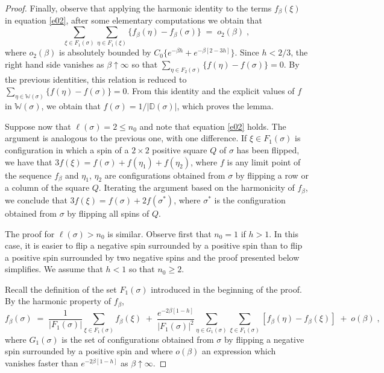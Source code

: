 \documentclass[reqno]{amsart}
\begin{document}
\begin{proof}
Finally, observe that applying the harmonic identity to the terms
$f_\beta(\xi)$ in equation \eqref{e02}, after some elementary
computations we obtain that
\begin{equation*}
\sum_{\xi\in F_1(\sigma)} \sum_{\eta\in F_1(\xi)} 
\{ f_\beta(\eta) - f_\beta(\sigma) \} \;=\;  o_2(\beta) \;,
\end{equation*}
where $o_2(\beta)$ is absolutely bounded by $C_0 \{e^{-\beta h} +
e^{-\beta [2-3h]}\}$. Since $h<2/3$, the right hand side vanishes as
$\beta\uparrow\infty$ so that $\sum_{\eta\in F_2(\sigma)} \{ f(\eta) -
f(\sigma) \} = 0$. By the previous identities, this relation is
reduced to $\sum_{\eta\in {{\mathbb W}}(\sigma)} \{ f(\eta) - f(\sigma) \} =
0$. From this identity and the explicit values of $f$ in ${{\mathbb W}}(\sigma)$, we obtain that $f(\sigma) = 1/|{{\mathbb D}}(\sigma)|$, which
proves the lemma.

Suppose now that $\ell(\sigma)=2\le n_0$ and note that equation
\eqref{e02} holds. The argument is analogous to the previous one, with
one difference. If $\xi\in F_1(\sigma)$ is configuration in which a
spin of a $2\times 2$ positive square $Q$ of $\sigma$ has been
flipped, we have that $3 f(\xi) = f(\sigma) + f(\eta_1) + f(\eta_2)$,
where $f$ is any limit point of the sequence $f_\beta$ and $\eta_1$,
$\eta_2$ are configurations obtained from $\sigma$ by flipping a row
or a column of the square $Q$. Iterating the argument based on the
harmonicity of $f_\beta$, we conclude that $3 f(\xi) = f(\sigma) + 2
f(\sigma^*)$, where $\sigma^*$ is the configuration obtained from
$\sigma$ by flipping all spins of $Q$.

The proof for $\ell (\sigma)>n_0$ is similar. Observe first that
$n_0=1$ if $h>1$. In this case, it is easier to flip a negative spin
surrounded by a positive spin than to flip a positive spin surrounded
by two negative spins and the proof presented below simplifies. We
assume that $h<1$ so that $n_0\ge 2$.

Recall the definition of the set $F_1(\sigma)$ introduced in the
beginning of the proof.  By the harmonic property of $f_\beta$,
\begin{equation*}
f_\beta(\sigma) \;=\; \frac 1{|F_1(\sigma)|} \sum_{\xi \in F_1(\sigma)}
f_\beta(\xi) \;+\; \frac{e^{-2\beta[1-h]}}{|F_1(\sigma)|^2}
\sum_{\eta \in G_1(\sigma)} \sum_{\xi \in F_1(\sigma)}
[f_\beta(\eta)-f_\beta(\xi)] \;+\; o(\beta)\;,
\end{equation*}
where $G_1(\sigma)$ is the set of configurations obtained from
$\sigma$ by flipping a negative spin surrounded by a positive spin and
where $o(\beta)$ an expression which vanishes faster than
$e^{-2\beta[1-h]}$ as $\beta\uparrow\infty$.


\end{proof}
\end{document}
